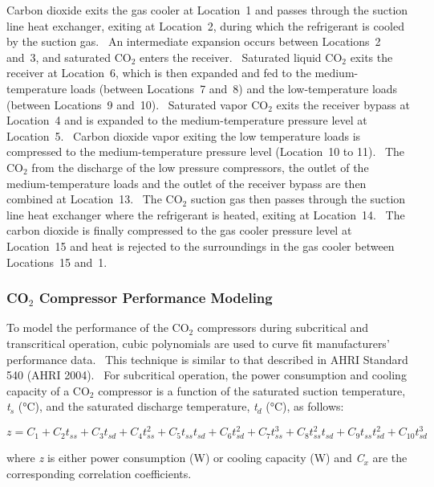 Carbon dioxide exits the gas cooler at Location~1 and passes through the suction line heat exchanger, exiting at Location~2, during which the refrigerant is cooled by the suction gas.~ An intermediate expansion occurs between Locations~2 and~3, and saturated CO\(_{2}\) enters the receiver.~ Saturated liquid CO\(_{2}\) exits the receiver at Location~6, which is then expanded and fed to the medium-temperature loads (between Locations~7 and~8) and the low-temperature loads (between Locations~9 and~10).~ Saturated vapor CO\(_{2}\) exits the receiver bypass at Location~4 and is expanded to the medium-temperature pressure level at Location~5.~ Carbon dioxide vapor exiting the low temperature loads is compressed to the medium-temperature pressure level (Location~10 to 11).~ The CO\(_{2}\) from the discharge of the low pressure compressors, the outlet of the medium-temperature loads and the outlet of the receiver bypass are then combined at Location~13.~ The CO\(_{2}\) suction gas then passes through the suction line heat exchanger where the refrigerant is heated, exiting at Location~14.~ The carbon dioxide is finally compressed to the gas cooler pressure level at Location~15 and heat is rejected to the surroundings in the gas cooler between Locations~15 and~1.

\subsubsection{\texorpdfstring{CO\(_{2}\) Compressor Performance Modeling}{CO\_\{2\} Compressor Performance Modeling}}\label{coux5f2-compressor-performance-modeling}

To model the performance of the CO\(_{2}\) compressors during subcritical and transcritical operation, cubic polynomials are used to curve fit manufacturers' performance data.~ This technique is similar to that described in AHRI Standard 540 (AHRI 2004).~ For subcritical operation, the power consumption and cooling capacity of a CO\(_{2}\) compressor is a function of the saturated suction temperature, \emph{t\(_{s}\)} (°C), and the saturated discharge temperature, \emph{t\(_{d}\)} (°C), as follows:

\begin{equation}
z = {C_1} + {C_2}{t_{ss}} + {C_3}{t_{sd}} + {C_4}t_{ss}^2 + {C_5}{t_{ss}}{t_{sd}} + {C_6}t_{sd}^2 + {C_7}t_{ss}^3 + {C_8}t_{ss}^2{t_{sd}} + {C_9}{t_{ss}}t_{sd}^2 + {C_{10}}t_{sd}^3
\end{equation}

where \emph{z} is either power consumption (W) or cooling capacity (W) and \emph{C\(_{x}\)} are the corresponding correlation coefficients.

